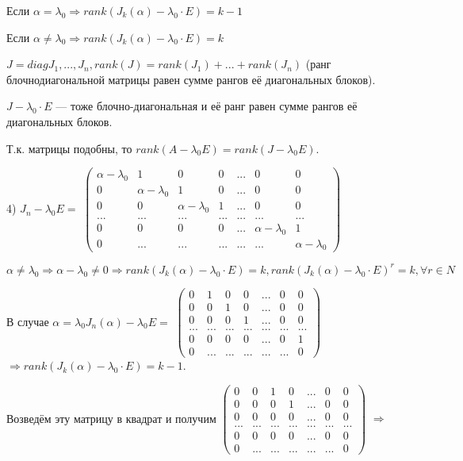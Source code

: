 \documentclass[a4paper, 12pt]{report}
\begin{document}
	Если $\alpha = \lambda_0 \Rightarrow rank(J_k(\alpha) - \lambda_0 \cdot E) = k - 1$
	
	Если $\alpha \ne \lambda_0 \Rightarrow rank(J_k(\alpha) - \lambda_0 \cdot E) = k$
	
	$J = diag{J_1, ..., J_n}, rank(J) = rank(J_1) + ... + rank(J_n)$ (ранг блочнодиагональной матрицы равен сумме рангов её диагональных блоков).
	
	$J - \lambda_0\cdot E $ --- тоже блочно-диагональная и её ранг равен сумме рангов её диагональных блоков.
	
	Т.к. матрицы подобны, то $rank(A - \lambda_0 E) = rank(J - \lambda_0 E)$.
	
	4) $J_n - \lambda_0 E = $
	$\begin{pmatrix} \alpha - \lambda_0 & 1 & 0 & 0 & ... & 0 & 0 \\
		0 & \alpha - \lambda_0 & 1 & 0 & ... & 0 & 0 \\
		0 & 0 & \alpha - \lambda_0 & 1 & ... & 0 & 0 \\
		... & ... & ... & ... & ... & ... & ...\\
		0 & 0 & 0 & 0 & ... & \alpha - \lambda_0 & 1 \\
		0 & ... & ... & ... & ... & ... & \alpha - \lambda_0
	\end{pmatrix}$
	
	$\alpha \ne \lambda_0 \Rightarrow \alpha - \lambda_0 \ne 0 \Rightarrow rank(J_k(\alpha) - \lambda_0\cdot E) = k, rank(J_k(\alpha) - \lambda_0\cdot E)^r = k, \forall r \in N$
	
	В случае $\alpha = \lambda_0 J_n(\alpha) - \lambda_0 E = $
	$\begin{pmatrix}  0 & 1 & 0 & 0 & ... & 0 & 0 \\
		0 & 0 & 1 & 0 & ... & 0 & 0 \\
		0 & 0 & 0 & 1 & ... & 0 & 0 \\
		... & ... & ... & ... & ... & ... & ...\\
		0 & 0 & 0 & 0 & ... & 0 & 1 \\
		0 & ... & ... & ... & ... & ... & 0
	\end{pmatrix}$ $\Rightarrow rank(J_k(\alpha) - \lambda_0\cdot E) = k - 1$.
	
	Возведём эту матрицу в квадрат и получим $\begin{pmatrix}  0 & 0 & 1 & 0 & ... & 0 & 0 \\
		0 & 0 & 0 & 1 & ... & 0 & 0 \\
		0 & 0 & 0 & 0 & ... & 0 & 0 \\
		... & ... & ... & ... & ... & ... & ...\\
		0 & 0 & 0 & 0 & ... & 0 & 0 \\
		0 & ... &  ... & ... & ... & ... & 0
	\end{pmatrix}$ $\Rightarrow $
	
\end{document}
